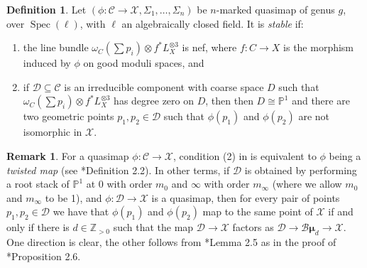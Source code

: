 \documentclass{amsart}
\newcommand{\bP}{\mathbb{P}}
\newcommand{\bZ}{\mathbb{Z}}
\newcommand{\sC}{\mathscr{C}}
\newcommand{\sD}{\mathscr{D}}
\newcommand{\cB}{\mathcal{B}}
\newcommand{\cX}{\mathcal{X}}
\newcommand{\spec}{\operatorname{Spec}}
\newcommand{\bmu}{\bm{\mu}}
\theoremstyle{definition}
\newtheorem{Def}[theorem]{Definition}
\newtheorem{Remark}[theorem]{Remark}
\theoremstyle{definition}
\begin{document}
{\begin{Def}\label{def_stable_qmap}
    Let $(\phi:\sC\to \cX, \Sigma_1,\ldots, \Sigma_n) $ be $n$-marked quasimap of genus $g$, over $\spec(\ell)$, with $\ell$ an algebraically closed field. It is \emph{stable} if:
    \begin{enumerate}
        \item the line bundle $\omega_C(\sum p_i)\otimes f^*L_X^{\otimes 3}$ is nef, where $f:C\to X$ is the morphism induced by $\phi$ on good moduli spaces, and
        \item if $\sD\subseteq \sC$ is an irreducible component with coarse space $D$ such that $\omega_C(\sum p_i)\otimes f^*L_X^{\otimes 3}$ has degree zero on $D$, then then $D\cong \bP^1$ and there are two geometric points $p_1,p_2\in \sD$ such that $\phi(p_1)$ and $\phi(p_2)$ are not isomorphic in $\cX$.
    \end{enumerate}
\end{Def}
\begin{Remark}
    {For a quasimap $\phi:\sC\to \cX$, condition (2) in  is equivalent to $\phi$ being a \textit{twisted map} (see \cite{dli1}*{Definition 2.2}). In other terms, if $\sD$ is obtained by performing a root stack of $\bP^1$ at 0 with order $m_0$ and $\infty$ with order $m_\infty$ (where we allow $m_0$ and $m_\infty$ to be 1), and $\phi:\sD\to \cX$ is a quasimap, then for every pair of points $p_1,p_2\in \sD$ we have that $\phi(p_1)$ and $\phi(p_2)$ map to the same point of $\cX$ if and only if there is $d\in \bZ_{>0}$ such that the map $\sD\to\cX$ factors as $\sD\to \cB\bmu_d\to\cX$. One direction is clear, the other follows from \cite{dli1}*{Lemma 2.5} as in the proof of \cite{dli1}*{Proposition 2.6}.}
\end{Remark}

}
\end{document}
